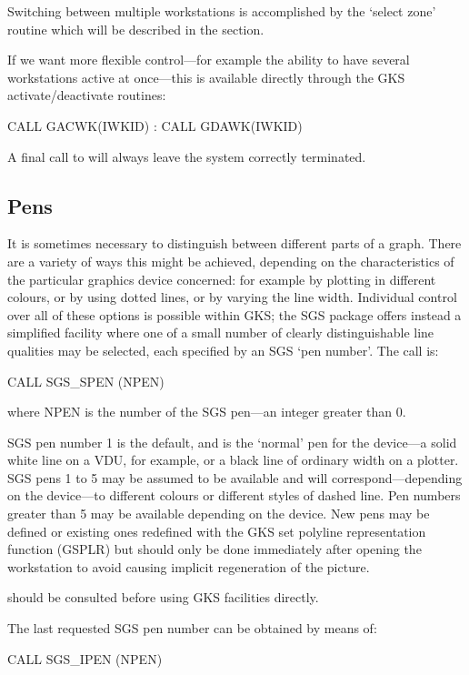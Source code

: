 \documentclass[11pt]{starlink}
\begin{document}
Switching between multiple workstations is accomplished by the `select
zone' routine which will be described in the
 section.

If we want more flexible control---for example the ability to have several
workstations active at once---this is available
directly through the GKS activate/deactivate routines:
\begin{terminalv}
CALL GACWK(IWKID)
       :
CALL GDAWK(IWKID)
\end{terminalv}
A final call to 
will always leave the system correctly terminated.

\subsection {Pens}

It is sometimes necessary to distinguish between different parts
of a graph.  There are a variety
of ways this might be achieved, depending
on the characteristics of the particular graphics device
concerned: for example
by plotting in different
colours, or by using dotted lines, or by varying the
line width.  Individual control over all of
these options is possible within GKS;  the
SGS package offers instead a simplified facility
where one of a small
number of clearly distinguishable line qualities may
be selected, each specified by an SGS `pen number'.  The call is:
\begin{terminalv}
CALL SGS_SPEN (NPEN)
\end{terminalv}
where NPEN is the number of the SGS pen---an integer greater than 0.

SGS pen number 1 is the default, and is the `normal' pen for the
device---a solid white line on a VDU, for example, or a black
line of ordinary width on a plotter.  SGS pens 1 to 5
may be assumed to be available and will correspond---depending
on the device---to different colours or
different styles of dashed line.
Pen numbers greater than 5 may be available depending
on the device.  New pens may be defined or existing ones redefined with
the GKS set polyline representation function (GSPLR) but should only
be done immediately after opening the workstation to avoid causing implicit
regeneration of the picture.

 should be
consulted before using GKS facilities directly.

The last requested SGS pen number can be obtained by means of:
\begin{terminalv}
CALL SGS_IPEN (NPEN)
\end{terminalv}
\end{document}
